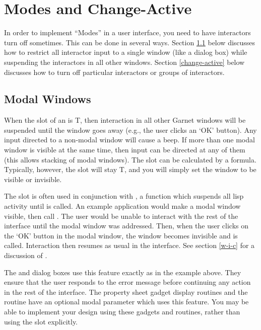 \section{Modes and Change-Active}
\label{active}

In order to implement ``Modes'' in a user interface, you need to have
interactors turn off sometimes.  This can be done in several ways.  Section
\ref{modal-p} below discusses how to restrict all interactor input to a
single window (like a dialog box) while suspending the interactors in all
other windows.  Section \ref{change-active} below discusses how to turn off
particular interactors or groups of interactors.


\subsection{Modal Windows}
\label{modal-p}

When the  slot of an  is T,
then interaction in all other Garnet windows
will be suspended until the window goes away (e.g., the user clicks an `OK'
button).  Any input directed to a non-modal window will
cause a beep.  If more than one modal window is visible at the same time,
then input can be directed at any of them (this allows stacking of modal
windows).  The  slot can be calculated by a formula.
Typically, however, the  slot will stay T, and you will
simply set the window to be visible or invisible.

The  slot is often used in conjunction with
, a function which suspends all lisp activity
until  is called.  An example application would make
a modal window visible, then call .  The user
would be unable to interact with the rest of the interface until the modal
window was addressed.  Then, when the user clicks on the `OK' button in the
modal window, the window becomes invisible and  is
called.  Interaction then resumes as usual in the interface.
See section \ref{w-i-c} for a discussion of .

The  and  dialog boxes use this feature
exactly as in the example above.  They
ensure that the user responds to the error message before continuing any
action in the rest of the interface.  The property sheet gadget display
routines and the  routine have an optional modal
parameter which uses this feature.  You may be able to implement your design
using these gadgets and routines, rather than using the  slot
explicitly.



